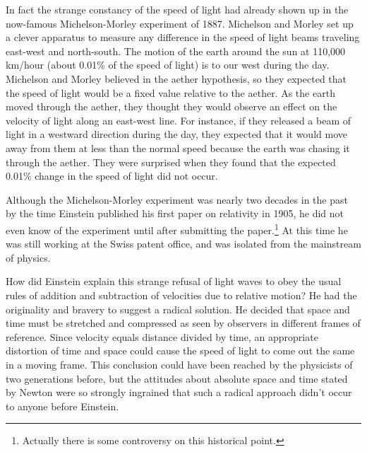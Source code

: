 In fact the strange constancy of the speed of light had already
shown up in the now-famous Michelson-Morley experiment of
1887. Michelson and Morley set up a clever apparatus to
measure any difference in the speed of light beams traveling
east-west and north-south. The motion of the earth around
the sun at 110,000 km/hour (about 0.01\% of the speed of
light) is to our west during the day. Michelson and Morley
believed in the aether hypothesis, so they expected that the
speed of light would be a fixed value relative to the aether.
As the earth moved through the aether, they thought they
would observe an effect on the velocity of light along an
east-west line. For instance, if they released a beam of
light in a westward direction during the day, they expected
that it would move away from them at less than the normal
speed because the earth was chasing it through the aether.
They were surprised when they found that the expected 0.01\%
change in the speed of light did not occur.

Although the Michelson-Morley experiment was nearly two
dec\-ades in the past by the time Einstein published his first
paper on relativity in 1905, he did not even know of the
experiment until after submitting the paper.\footnote{Actually there is
some controversy on this historical point.} At this time he
was still working at the Swiss patent office, and was
isolated from the mainstream of physics.

How did Einstein explain this strange refusal of light waves
to obey the usual rules of addition and subtraction of
velocities due to relative motion? He had the originality
and bravery to suggest a radical solution. He decided that
space and time must be stretched and compressed as seen by
observers in different frames of reference. Since velocity
equals distance divided by time, an appropriate distortion
of time and space could cause the speed of light to come out
the same in a moving frame. This conclusion could have been
reached by the physicists of two generations before,
but the
attitudes about absolute space and time stated by Newton
were so strongly ingrained that such a radical approach didn't
occur to anyone before Einstein.


